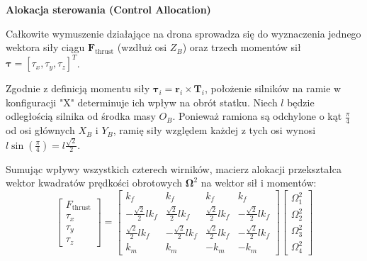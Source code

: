 \vspace{1em}
\textbf{Alokacja sterowania (Control Allocation)}

Całkowite wymuszenie działające na drona sprowadza się do wyznaczenia jednego wektora siły ciągu $\mathbf{F}_{\text{thrust}}$ (wzdłuż osi $Z_B$) oraz trzech momentów sił $\boldsymbol{\tau} = [\tau_x, \tau_y, \tau_z]^T$. 

Zgodnie z definicją momentu siły $\boldsymbol{\tau}_i = \mathbf{r}_i \times \mathbf{T}_i$, położenie silników na ramie w konfiguracji "X" determinuje ich wpływ na obrót statku. Niech $l$ będzie odległością silnika od środka masy $O_B$. Ponieważ ramiona są odchylone o kąt $\frac{\pi}{4}$ od osi głównych $X_B$ i $Y_B$, ramię siły względem każdej z tych osi wynosi $l \sin(\frac{\pi}{4}) = l \frac{\sqrt{2}}{2}$.

Sumując wpływy wszystkich czterech wirników, macierz alokacji przekształca wektor kwadratów prędkości obrotowych $\boldsymbol{\Omega}^2$ na wektor sił i momentów:
\begin{equation}
    \begin{bmatrix}
    F_{\text{thrust}} \\ \tau_x \\ \tau_y \\ \tau_z
    \end{bmatrix}
    =
    \begin{bmatrix}
    k_f & k_f & k_f & k_f \\
    -\frac{\sqrt{2}}{2}lk_f & \frac{\sqrt{2}}{2}lk_f & \frac{\sqrt{2}}{2}lk_f & -\frac{\sqrt{2}}{2}lk_f \\
    \frac{\sqrt{2}}{2}lk_f & -\frac{\sqrt{2}}{2}lk_f & \frac{\sqrt{2}}{2}lk_f & -\frac{\sqrt{2}}{2}lk_f \\
    k_m & k_m & -k_m & -k_m
    \end{bmatrix}
    \begin{bmatrix}
    \Omega_1^2 \\ \Omega_2^2 \\ \Omega_3^2 \\ \Omega_4^2
    \end{bmatrix}
\end{equation}

